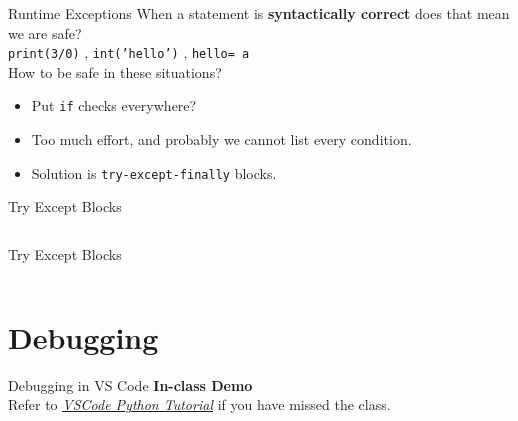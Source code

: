     \begin{frame}{Runtime Exceptions}
        \LARGE
        When a statement is \textbf{syntactically correct} does that mean we are safe?\\
        \pause
        \texttt{print(3/0)}
        \pause
        , \texttt{int('hello')}
        \pause
        , \texttt{\textquotesingle hello\textquotesingle [2] = \textquotesingle a\textquotesingle }\\
        \pause
        How to be safe in these situations?
        \begin{itemize}
            \pause
            \item Put \texttt{if} checks everywhere?
            \pause
            \item Too much effort, and probably we cannot list every condition.
            \pause
            \item Solution is \texttt{try-except-finally} blocks.
        \end{itemize}
    \end{frame}

    \begin{frame}{Try Except Blocks}
        \inputminted[frame=single,framesep=2pt]{python3}{./code_examples/try_except_finally.py}
    \end{frame}

    \begin{frame}{Try Except Blocks}
        \LARGE
        \inputminted[frame=single,framesep=2pt,lastline=9]{python3}{./code_examples/try_except.py}
    \end{frame}

    \section{Debugging}
    \begin{frame}{Debugging in VS Code}
        \centering
        \Huge
        \textbf{In-class Demo}\\
        \bigskip
        \Large
        Refer to \href{https://code.visualstudio.com/docs/python/python-tutorial}{\underline{\textit{VSCode Python Tutorial}}} if you have missed the class.
    \end{frame}

